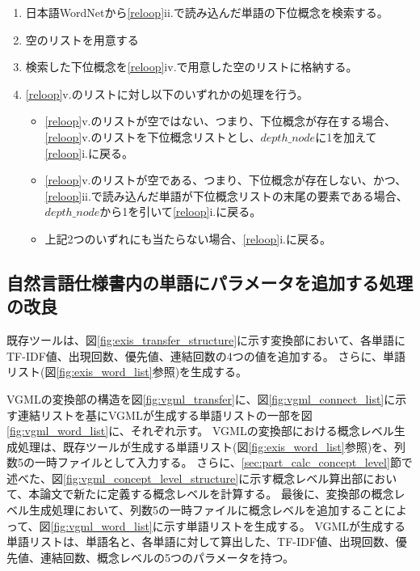 \begin{enumerate}
\begin{enumerate}
\begin{enumerate}
                    \item 日本語WordNetから\ref{reloop}ii.で読み込んだ単語の下位概念を検索する。
                    \item 空のリストを用意する
                    \label{sec:lower_concept_list2}
                    \item 検索した下位概念を\ref{reloop}iv.で用意した空のリストに格納する。
                    \label{sec:update_lower_concept_list}
                    \item \ref{reloop}v.のリストに対し以下のいずれかの処理を行う。
                    \begin{itemize}
                        \item \ref{reloop}v.のリストが空ではない、つまり、下位概念が存在する場合、\ref{reloop}v.のリストを下位概念リストとし、$depth\_node$に1を加えて\ref{reloop}i.に戻る。
                        \item \ref{reloop}v.のリストが空である、つまり、下位概念が存在しない、かつ、\ref{reloop}ii.で読み込んだ単語が下位概念リストの末尾の要素である場合、$depth\_node$から1を引いて\ref{reloop}i.に戻る。
                        \item 上記2つのいずれにも当たらない場合、\ref{reloop}i.に戻る。
                    \end{itemize}
                \end{enumerate}
        \end{enumerate}
\end{enumerate}

\subsection{自然言語仕様書内の単語にパラメータを追加する処理の改良}
\label{sec:improve_word_list}
既存ツールは、図\ref{fig:exis_transfer_structure}に示す変換部において、各単語にTF-IDF値、出現回数、優先値、連結回数の4つの値を追加する。
さらに、単語リスト(図\ref{fig:exis_word_list}参照)を生成する。

VGMLの変換部の構造を図\ref{fig:vgml_transfer}に、図\ref{fig:vgml_connect_list}に示す連結リストを基にVGMLが生成する単語リストの一部を図\ref{fig:vgml_word_list}に、それぞれ示す。
VGMLの変換部における概念レベル生成処理は、既存ツールが生成する単語リスト(図\ref{fig:exis_word_list}参照)を、列数5の一時ファイルとして入力する。
さらに、\ref{sec:part_calc_concept_level}節で述べた、図\ref{fig:vgml_concept_level_structure}に示す概念レベル算出部において、本論文で新たに定義する概念レベルを計算する。
最後に、変換部の概念レベル生成処理において、列数5の一時ファイルに概念レベルを追加することによって、図\ref{fig:vgml_word_list}に示す単語リストを生成する。
VGMLが生成する単語リストは、単語名と、各単語に対して算出した、TF-IDF値、出現回数、優先値、連結回数、概念レベルの5つのパラメータを持つ。

